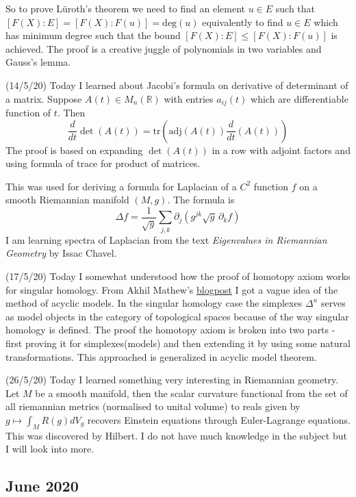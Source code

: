 \documentclass[12pt,a4paper]{article}
\begin{document}
So to prove L\"{u}roth's theorem we need to find an element $u \in E$ such that $[F(X):E] =[F(X):F(u)] = \text{deg}(u)$ equivalently to find $u\in E$ which has minimum degree such that the bound $[F(X):E] \le [F(X):F(u)]$ is achieved. The proof is a creative juggle of polynomials in two variables and Gauss's lemma.

(14/5/20) Today I learned about Jacobi's formula on derivative of determinant of a matrix. Suppose $A(t)\in M_n(\mathbb{R})$ with entries $a_{ij}(t)$ which are differentiable function of $t$. Then $$\frac{d}{dt} \det(A(t)) = \text{tr} \left(  \text{adj}(A(t))\frac{d}{dt}(A(t))\right) $$
The proof is based on expanding $\det(A(t))$ in a row with adjoint factors and using formula of trace for product of matrices.

This was used for deriving a formula for Laplacian of a $C^2$ function $f$ on a smooth Riemannian manifold $(M,g)$. The formula is $$\Delta f = \frac{1}{\sqrt{g}}\sum_{j,k} \partial_j(g^{jk}\sqrt{g}\,\partial_k f)$$
I am learning spectra of Laplacian from the text \textit{Eigenvalues in Riemannian Geometry} by Issac Chavel.

(17/5/20) Today I somewhat understood how the proof of homotopy axiom works for singular homology. From Akhil Mathew's \href{https://amathew.wordpress.com/2010/09/11/the-method-of-acyclic-models/}{blogpost} I got a vague idea of the method of acyclic models. In the singular homology case the simplexes $\Delta^n$ serves as model objects in the category of topological spaces because of the way singular homology is defined. The proof the homotopy axiom is broken into two parts - first proving it for simplexes(models) and then extending it by using some natural transformations. This approached is generalized in acyclic model theorem.

(26/5/20) Today I learned something very interesting in Riemannian geometry. Let $M$ be a smooth manifold, then the scalar curvature functional from the set of all riemannian metrics (normalised to unital volume) to reals given by  $g \mapsto \int_M R(g)dV_g$ recovers Einstein equations through Euler-Lagrange equations. This was discovered by Hilbert. %
I do not have much knowledge in the subject but I will look into more.


\subsection*{June 2020}
\end{document}
